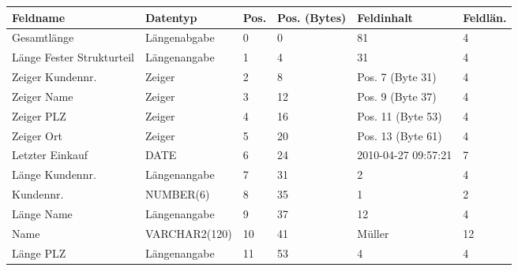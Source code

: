 \begin{enumerate}[a)]
	\begin{solution}
	{\small
	\begin{tabular}{p{2.8cm}lllll}
		\hline\hline
		\textbf{Feldname}         & \textbf{Datentyp} & \textbf{Pos.} & \textbf{Pos. (Bytes)} & \textbf{Feldinhalt}                & \textbf{Feldlän.} \\ \hline\hline
		Gesamtlänge               & Längenabgabe      & 0             & 0                     & 81                                 & 4                 \\ \hline
		Länge Fester Strukturteil & Längenangabe      & 1             & 4                     & 31                                 & 4                 \\ \hline
		Zeiger Kundennr.          & Zeiger            & 2             & 8                     & Pos. 7 (Byte 31)                   & 4                 \\ \hline
		Zeiger Name               & Zeiger            & 3             & 12                    & Pos. 9 (Byte 37)                   & 4                 \\ \hline
		Zeiger PLZ                & Zeiger            & 4             & 16                    & Pos. 11 (Byte 53)                  & 4                 \\ \hline
		Zeiger Ort                & Zeiger            & 5             & 20                    & Pos. 13 (Byte 61)                  & 4                 \\ \hline
		Letzter Einkauf           & DATE              & 6             & 24                    & \footnotesize{2010-04-27 09:57:21} & 7                 \\ \hline
		Länge Kundennr.           & Längenangabe      & 7             & 31                    & 2                                  & 4                 \\ \hline
		Kundennr.                 & NUMBER(6)         & 8             & 35                    & 1                                  & 2                 \\ \hline
		Länge Name                & Längenangabe      & 9             & 37                    & 12                                 & 4                 \\ \hline
		Name                      & VARCHAR2(120)     & 10            & 41                    & Müller                             & 12                \\ \hline
		Länge PLZ                 & Längenangabe      & 11            & 53                    & 4                                  & 4                 \\ \hline

\end{tabular}}
\end{solution}
\end{enumerate}
